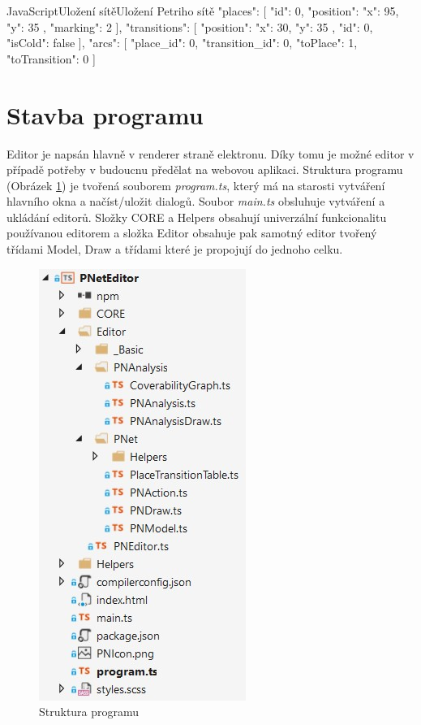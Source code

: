 \documentclass[
  biblatex,
  glossaries,
]{kidiplom}
\begin{document}
\begin{kicode}{JavaScript}{Uložení sítě}{Uložení Petriho sítě}
{
  "places": [
    {
      "id": 0,
      "position": {
        "x": 95, "y": 35
      },
      "marking": 2
    }
  ],
  "transitions": [
    {
      "position": {
        "x": 30, "y": 35
      },
      "id": 0,
      "isCold": false
    }
  ],
  "arcs": [
    {
      "place_id": 0,
      "transition_id": 0,
      "toPlace": 1,
      "toTransition": 0
    }
  ]
}
\end{kicode}



\section{Stavba programu}

Editor je napsán hlavně v renderer straně elektronu. Díky tomu je možné 
editor v případě potřeby v budoucnu předělat na webovou aplikaci.
Struktura programu (Obrázek \ref{Struktura programu}) je tvořená 
souborem \textit{program.ts}, který má na starosti vytváření hlavního okna 
a načíst/uložit dialogů. Soubor \textit{main.ts} obsluhuje vytváření
a ukládání editorů. Složky CORE a Helpers obsahují univerzální 
funkcionalitu používanou editorem a složka Editor obsahuje pak 
samotný editor tvořený třídami Model, Draw a 
třídami které je propojují do jednoho celku.


\begin{figure}[h]
  \centering
  \includegraphics[scale=1]{struktura_programu}
  \caption{Struktura programu}\label{Struktura programu}
\end{figure}
\end{document}
